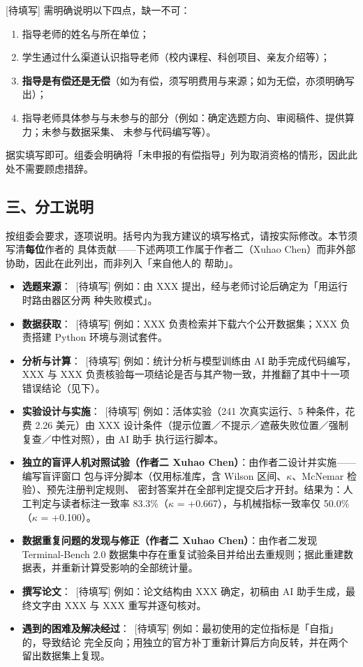 \documentclass[10pt]{article}
\begin{document}
[待填写] 需明确说明以下四点，缺一不可：
\begin{enumerate}[leftmargin=1.6em,itemsep=1pt]
  \item 指导老师的姓名与所在单位；
  \item 学生通过什么渠道认识指导老师（校内课程、科创项目、亲友介绍等）；
  \item \textbf{指导是有偿还是无偿}（如为有偿，须写明费用与来源；如为无偿，亦须明确写出）；
  \item 指导老师具体参与与未参与的部分（例如：确定选题方向、审阅稿件、提供算力；未参与数据采集、
        未参与代码编写等）。
\end{enumerate}
据实填写即可。组委会明确将「未申报的有偿指导」列为取消资格的情形，因此此处不需要顾虑措辞。

\subsection*{三、分工说明}

按组委会要求，逐项说明。括号内为我方建议的填写格式，请按实际修改。本节须写清\textbf{每位}作者的
具体贡献——下述两项工作属于作者二（Xuhao Chen）而非外部协助，因此在此列出，而非列入「来自他人的
帮助」。

\begin{itemize}[leftmargin=1.3em,itemsep=2pt]
  \item \textbf{选题来源}：\ [待填写] 例如：由 XXX 提出，经与老师讨论后确定为「用运行时路由器区分两
        种失败模式」。
  \item \textbf{数据获取}：\ [待填写] 例如：XXX 负责检索并下载六个公开数据集；XXX 负责搭建
        Python 环境与测试套件。
  \item \textbf{分析与计算}：\ [待填写] 例如：统计分析与模型训练由 AI 助手完成代码编写，XXX 与
        XXX 负责核验每一项结论是否与其产物一致，并推翻了其中十一项错误结论（见下）。
  \item \textbf{实验设计与实施}：\ [待填写] 例如：活体实验（241 次真实运行、5 种条件，花费 2.26
        美元）由 XXX 设计条件（提示位置／不提示／遮蔽失败位置／强制复查／中性对照），由 AI 助手
        执行运行脚本。
  \item \textbf{独立的盲评人机对照试验（作者二 Xuhao Chen）}：由作者二设计并实施——编写盲评窗口
        包与评分脚本（仅用标准库，含 Wilson 区间、$\kappa$、McNemar 检验）、预先注册判定规则、
        密封答案并在全部判定提交后才开封。结果为：人工判定与读者标注一致率 83.3\%（$\kappa$ =
        +0.667），与机械指标一致率仅 50.0\%（$\kappa$ = +0.100）。
  \item \textbf{数据重复问题的发现与修正（作者二 Xuhao Chen）}：由作者二发现 Terminal-Bench 2.0
        数据集中存在重复试验条目并给出去重规则；据此重建数据表，并重新计算受影响的全部统计量。
  \item \textbf{撰写论文}：\ [待填写] 例如：论文结构由 XXX 确定，初稿由 AI 助手生成，最终文字由
        XXX 与 XXX 重写并逐句核对。
  \item \textbf{遇到的困难及解决经过}：\ [待填写] 例如：最初使用的定位指标是「自指」的，导致结论
        完全反向；用独立的官方补丁重新计算后方向反转，并在两个留出数据集上复现。
\end{itemize}
\end{document}
